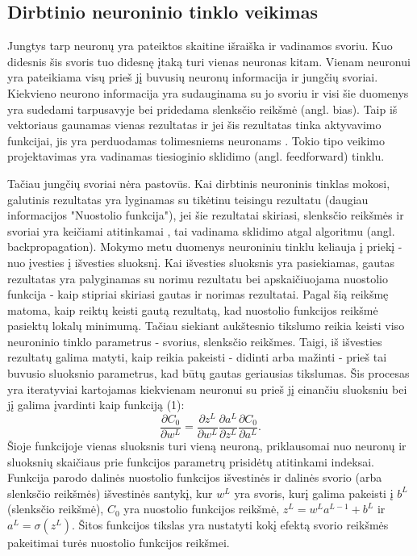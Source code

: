 \documentclass{VUMIFPSbakalaurinis}
\begin{document}
\subsection{Dirbtinio neuroninio tinklo veikimas}
Jungtys tarp neuronų yra pateiktos skaitine išraiška ir vadinamos svoriu. Kuo didesnis šis svoris tuo didesnę įtaką turi vienas neuronas kitam.
Vienam neuronui yra pateikiama visų prieš jį buvusių neuronų informacija ir jungčių svoriai. Kiekvieno neurono informacija yra sudauginama su
jo svoriu ir visi šie duomenys yra sudedami tarpusavyje bei pridedama slenksčio reikšmė (angl. bias). Taip iš vektoriaus gaunamas vienas rezultatas ir jei šis rezultatas tinka aktyvavimo
funkcijai, jis yra perduodamas tolimesniems neuronams \cite{shiffman2012nature}. Tokio tipo veikimo projektavimas yra vadinamas tiesioginio sklidimo (angl. feedforward) tinklu.

Tačiau jungčių svoriai nėra pastovūs. Kai dirbtinis neuroninis tinklas mokosi, galutinis rezultatas yra lyginamas su tikėtinu teisingu rezultatu (daugiau informacijos "Nuostolio funkcija"), jei šie
rezultatai skiriasi, slenksčio reikšmės ir svoriai yra keičiami atitinkamai \cite{backpropogation}, tai vadinama sklidimo atgal algoritmu (angl. backpropagation).
Mokymo metu duomenys neuroniniu tinklu keliauja į priekį - nuo įvesties į išvesties sluoksnį. Kai išvesties sluoksnis yra pasiekiamas, gautas rezultatas yra palyginamas su norimu rezultatu bei 
apskaičiuojama nuostolio funkcija - kaip stipriai skiriasi gautas ir norimas rezultatai. Pagal šią reikšmę matoma, kaip reiktų keisti gautą rezultatą, kad nuostolio funkcijos reikšmė pasiektų lokalų 
minimumą. Tačiau siekiant aukštesnio tikslumo reikia keisti viso neuroninio tinklo parametrus - svorius, slenksčio reikšmes. Taigi, iš išvesties rezultatų galima matyti, kaip reikia pakeisti - 
didinti arba mažinti - prieš tai buvusio sluoksnio parametrus, kad būtų gautas geriausias tikslumas. Šis procesas yra iteratyviai kartojamas kiekvienam neuronui su prieš jį einančiu sluoksniu bei jį galima įvardinti kaip funkciją (1):
\begin{equation}
\frac{\partial{C_{0}}}{\partial{w^{L}}} = \frac{\partial{z^{L}}}{\partial{w^{L}}} \frac{\partial{a^{L}}}{\partial{z^{L}}} \frac{\partial{C_{0}}}{\partial{a^{L}}}.
\end{equation}
Šioje funkcijoje vienas sluoksnis turi vieną neuroną, priklausomai nuo neuronų ir sluoksnių skaičiaus prie funkcijos parametrų prisidėtų atitinkami indeksai. Funkcija parodo dalinės nuostolio funkcijos 
išvestinės ir dalinės svorio (arba slenksčio reikšmės) išvestinės santykį, kur \(w^{L}\) yra svoris, kurį galima pakeisti į \(b^{L}\) (slenksčio reikšmė), \(C_{0}\) yra nuostolio funkcijos reikšmė, 
\(z^{L} = w^{L}a^{L-1}+b^{L}\) ir \(a^{L}=\sigma(z^{L})\). Šitos funkcijos tikslas yra nustatyti kokį efektą svorio reikšmės pakeitimai turės nuostolio funkcijos reikšmei.
\end{document}
